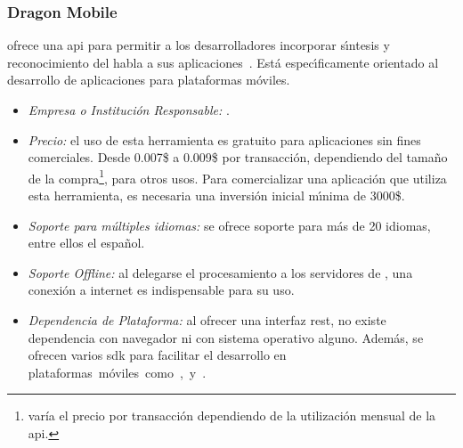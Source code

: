 \subsubsection{Dragon Mobile}
\label{sec:dragonmobile}

 ofrece una \gls{api} para permitir
a los desarrolladores incorporar s{\'\i}ntesis y reconocimiento del habla a sus
\mbox{aplicaciones \cite{DragonMobile}}. Est\'a espec{\'\i}ficamente orientado al desarrollo de
aplicaciones para plataformas m\'oviles.

\begin{itemize}
	\item \emph{Empresa o Instituci\'on Responsable:} .
	\item \emph{Precio:} el uso de esta herramienta es gratuito para aplicaciones sin fines comerciales.
        Desde 0.007\$ a 0.009\$ por transacci\'on, dependiendo del tama\~no de la compra\footnote{ var\'ia el precio
        por transacci\'on dependiendo de la utilizaci\'on mensual de la \gls{api}.}, para otros usos.
	Para comercializar una aplicaci\'on que utiliza esta herramienta, es necesaria una inversi\'on inicial
	m{\'\i}nima de 3000\$.
	\item \emph{Soporte para m\'ultiples idiomas:} se ofrece soporte para m\'as de 20 idiomas, entre ellos
	el espa\~nol.
	\item \emph{Soporte Offline:} al delegarse el procesamiento a los servidores de ,
	una conexi\'on a internet es indispensable para su uso.
	\item \emph{Dependencia de Plataforma:} al ofrecer una interfaz \gls{rest}, no existe dependencia con navegador
	ni con sistema operativo alguno. Adem\'as, se ofrecen varios \gls{sdk} para facilitar
    el desarrollo en \mbox{plataformas m\'oviles como ,  y .}
\end{itemize}